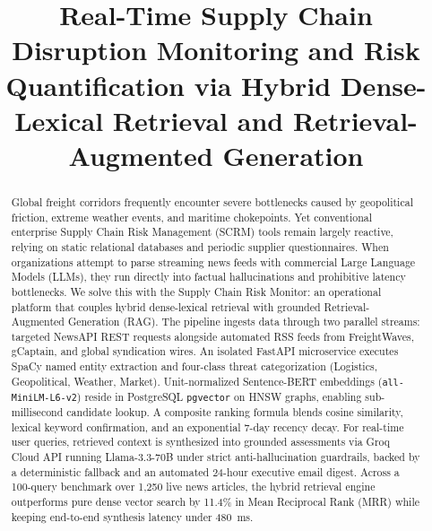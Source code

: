 \documentclass[conference]{IEEEtran}
\begin{document}
\title{Real-Time Supply Chain Disruption Monitoring and Risk Quantification via Hybrid Dense-Lexical Retrieval and Retrieval-Augmented Generation}

\author{
    \and
}

\maketitle

\begin{abstract}
Global freight corridors frequently encounter severe bottlenecks caused by geopolitical friction, extreme weather events, and maritime chokepoints. Yet conventional enterprise Supply Chain Risk Management (SCRM) tools remain largely reactive, relying on static relational databases and periodic supplier questionnaires. When organizations attempt to parse streaming news feeds with commercial Large Language Models (LLMs), they run directly into factual hallucinations and prohibitive latency bottlenecks. We solve this with the Supply Chain Risk Monitor: an operational platform that couples hybrid dense-lexical retrieval with grounded Retrieval-Augmented Generation (RAG). The pipeline ingests data through two parallel streams: targeted NewsAPI REST requests alongside automated RSS feeds from FreightWaves, gCaptain, and global syndication wires. An isolated FastAPI microservice executes SpaCy named entity extraction and four-class threat categorization (Logistics, Geopolitical, Weather, Market). Unit-normalized Sentence-BERT embeddings (\texttt{all-MiniLM-L6-v2}) reside in PostgreSQL \texttt{pgvector} on HNSW graphs, enabling sub-millisecond candidate lookup. A composite ranking formula blends cosine similarity, lexical keyword confirmation, and an exponential 7-day recency decay. For real-time user queries, retrieved context is synthesized into grounded assessments via Groq Cloud API running Llama-3.3-70B under strict anti-hallucination guardrails, backed by a deterministic fallback and an automated 24-hour executive email digest. Across a 100-query benchmark over 1,250 live news articles, the hybrid retrieval engine outperforms pure dense vector search by 11.4\% in Mean Reciprocal Rank (MRR) while keeping end-to-end synthesis latency under 480~ms.
\end{abstract}
\end{document}
